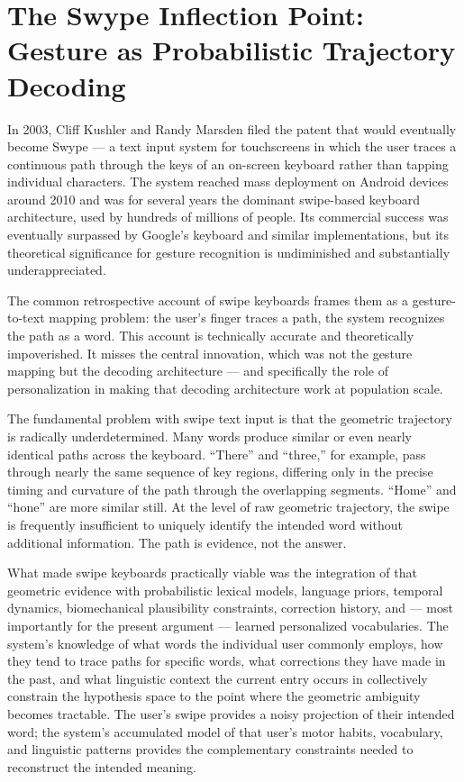 \documentclass[11pt, a4paper]{article}
\theoremstyle{definition}
\begin{document}
\section{The Swype Inflection Point: Gesture as Probabilistic Trajectory Decoding}

In 2003, Cliff Kushler and Randy Marsden filed the patent that would eventually become Swype --- a text input system for touchscreens in which the user traces a continuous path through the keys of an on-screen keyboard rather than tapping individual characters. The system reached mass deployment on Android devices around 2010 and was for several years the dominant swipe-based keyboard architecture, used by hundreds of millions of people. Its commercial success was eventually surpassed by Google's keyboard and similar implementations, but its theoretical significance for gesture recognition is undiminished and substantially underappreciated.

The common retrospective account of swipe keyboards frames them as a gesture-to-text mapping problem: the user's finger traces a path, the system recognizes the path as a word. This account is technically accurate and theoretically impoverished. It misses the central innovation, which was not the gesture mapping but the decoding architecture --- and specifically the role of personalization in making that decoding architecture work at population scale.

The fundamental problem with swipe text input is that the geometric trajectory is radically underdetermined. Many words produce similar or even nearly identical paths across the keyboard. ``There'' and ``three,'' for example, pass through nearly the same sequence of key regions, differing only in the precise timing and curvature of the path through the overlapping segments. ``Home'' and ``hone'' are more similar still. At the level of raw geometric trajectory, the swipe is frequently insufficient to uniquely identify the intended word without additional information. The path is evidence, not the answer.

What made swipe keyboards practically viable was the integration of that geometric evidence with probabilistic lexical models, language priors, temporal dynamics, biomechanical plausibility constraints, correction history, and --- most importantly for the present argument --- learned personalized vocabularies. The system's knowledge of what words the individual user commonly employs, how they tend to trace paths for specific words, what corrections they have made in the past, and what linguistic context the current entry occurs in collectively constrain the hypothesis space to the point where the geometric ambiguity becomes tractable. The user's swipe provides a noisy projection of their intended word; the system's accumulated model of that user's motor habits, vocabulary, and linguistic patterns provides the complementary constraints needed to reconstruct the intended meaning.
\end{document}
